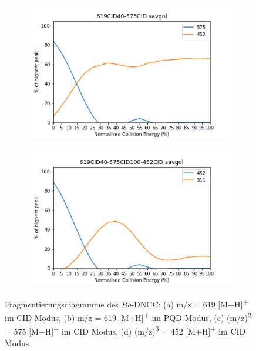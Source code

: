 \begin{figure}[!htbp]
  \begin{subfigure}[b]{0.5\textwidth}
    \includegraphics[width=\textwidth]{content/Anhang/ESIMS/Bo-DNCC/619CID40-575CID-575savgol.png}
    \caption{}
  \end{subfigure}
  \hfill
  \begin{subfigure}[b]{0.5\textwidth}
    \includegraphics[width=\textwidth]{content/Anhang/ESIMS/Bo-DNCC/619CID40-575CID100-452CID-452savgol.png}
    \caption{}
  \end{subfigure}
  
  \caption[Fragmentierungsdiagramme des \textit{Bo}-DNCC, Quelle: Autor]{Fragmentierungsdiagramme des \textit{Bo}-DNCC: (a) m/z = 619 [M+H]\textsuperscript{+} im CID Modus, (b) m/z = 619 [M+H]\textsuperscript{+} im PQD Modus, (c) (m/z)\textsuperscript{2} = 575 [M+H]\textsuperscript{+} im CID Modus, (d) (m/z)\textsuperscript{3} = 452 [M+H]\textsuperscript{+} im CID Modus }
\end{figure}

